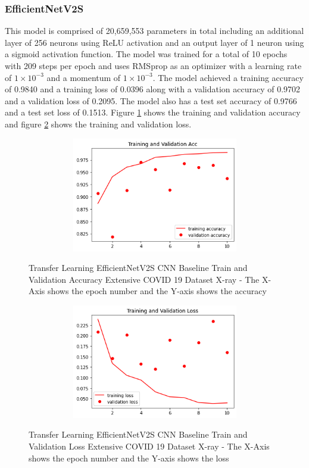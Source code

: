 \subsubsection{EfficientNetV2S}
This model is comprised of 20,659,553 parameters in total including an additional layer of 256 neurons using ReLU activation and an output layer of 1 neuron using a sigmoid activation function.  The model was trained for a total of 10 epochs with 209 steps per epoch and uses RMSprop as an optimizer with a learning rate of $1\times10^{-3}$ and a momentum of $1\times10^{-3}$.  The model achieved a training accuracy of 0.9840 and a training loss of 0.0396 along with a validation accuracy of 0.9702 and a validation loss of 0.2095.  The model also has a test set accuracy of 0.9766 and a test set loss of 0.1513.  Figure \ref{fig:EfficientNetV2S CNN Baseline Train and Validation Accuracy Extensive COVID 19 Dataset Xray} shows the training and validation accuracy and figure \ref{fig:EfficientNetV2S CNN Baseline Train and Validation Loss Extensive COVID 19 Dataset X-ray} shows the training and validation loss.
 \begin{figure}[H]
    \centering    \includegraphics[width=1\textwidth,height=5cm,keepaspectratio]{Images/EfficientNetV2SBaselineTrainingValidationAccuracyExtensiveCT.png}\\
    \caption{Transfer Learning EfficientNetV2S CNN Baseline Train and Validation Accuracy Extensive COVID 19 Dataset X-ray - The X-Axis shows the epoch number and the Y-axis shows the accuracy}
    \label{fig:EfficientNetV2S CNN Baseline Train and Validation Accuracy Extensive COVID 19 Dataset Xray}
\end{figure}
 \begin{figure}[H]
    \centering
    \includegraphics[width=1\textwidth,height=5cm,keepaspectratio]{Images/EfficientNetV2SBaselineTrainingValidationLossExtensiveXray.png}\\
    \caption{Transfer Learning EfficientNetV2S CNN Baseline Train and Validation Loss Extensive COVID 19 Dataset X-ray - The X-Axis shows the epoch number and the Y-axis shows the loss}
    \label{fig:EfficientNetV2S CNN Baseline Train and Validation Loss Extensive COVID 19 Dataset X-ray}
\end{figure}

